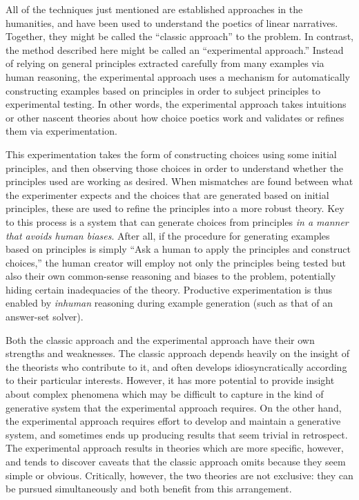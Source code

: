 All of the techniques just mentioned are established approaches in the humanities, and have been used to understand the poetics of linear narratives.
%
Together, they might be called the ``classic approach'' to the problem.
%
In contrast, the method described here might be called an ``experimental approach.''
%
Instead of relying on general principles extracted carefully from many examples via human reasoning, the experimental approach uses a mechanism for automatically constructing examples based on principles in order to subject principles to experimental testing.
%
In other words, the experimental approach takes intuitions or other nascent theories about how choice poetics work and validates or refines them via experimentation.


This experimentation takes the form of constructing choices using some initial principles, and then observing those choices in order to understand whether the principles used are working as desired.
%
When mismatches are found between what the experimenter expects and the choices that are generated based on initial principles, these are used to refine the principles into a more robust theory.
%
Key to this process is a system that can generate choices from principles \emph{in a manner that avoids human biases}.
%
After all, if the procedure for generating examples based on principles is simply ``Ask a human to apply the principles and construct choices,'' the human creator will employ not only the principles being tested but also their own common-sense reasoning and biases to the problem, potentially hiding certain inadequacies of the theory.
%
Productive experimentation is thus enabled by \emph{inhuman} reasoning during example generation (such as that of an answer-set solver).


Both the classic approach and the experimental approach have their own strengths and weaknesses.
%
The classic approach depends heavily on the insight of the theorists who contribute to it, and often develops idiosyncratically according to their particular interests.
%
However, it has more potential to provide insight about complex phenomena which may be difficult to capture in the kind of generative system that the experimental approach requires.
%
On the other hand, the experimental approach requires effort to develop and maintain a generative system, and sometimes ends up producing results that seem trivial in retrospect.
%
The experimental approach results in theories which are more specific, however, and tends to discover caveats that the classic approach omits because they seem simple or obvious.
%
Critically, however, the two theories are not exclusive: they can be pursued simultaneously and both benefit from this arrangement.


